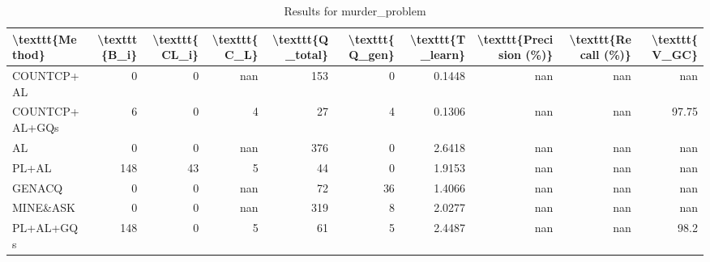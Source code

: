 \begin{table}[ht]
\caption{Results for murder_problem}
\begin{tabular}{lrrrrrrrrr}
\hline
 \textbackslash{}texttt\{Method\}   &   \textbackslash{}texttt\{B\_i\} &   \textbackslash{}texttt\{CL\_i\} &   \textbackslash{}texttt\{C\_L\} &   \textbackslash{}texttt\{Q\_total\} &   \textbackslash{}texttt\{Q\_gen\} &   \textbackslash{}texttt\{T\_learn\} &   \textbackslash{}texttt\{Precision (\%)\} &   \textbackslash{}texttt\{Recall (\%)\} &   \textbackslash{}texttt\{V\_GC\} \\
\hline
 COUNTCP+AL        &              0 &               0 &            nan &                153 &                0 &             0.1448 &                      nan &                   nan &          nan    \\
 COUNTCP+AL+GQs    &              6 &               0 &              4 &                 27 &                4 &             0.1306 &                      nan &                   nan &           97.75 \\
 AL                &              0 &               0 &            nan &                376 &                0 &             2.6418 &                      nan &                   nan &          nan    \\
 PL+AL             &            148 &              43 &              5 &                 44 &                0 &             1.9153 &                      nan &                   nan &          nan    \\
 GENACQ            &              0 &               0 &            nan &                 72 &               36 &             1.4066 &                      nan &                   nan &          nan    \\
 MINE\&ASK          &              0 &               0 &            nan &                319 &                8 &             2.0277 &                      nan &                   nan &          nan    \\
 PL+AL+GQs         &            148 &               0 &              5 &                 61 &                5 &             2.4487 &                      nan &                   nan &           98.2  \\
\hline
\end{tabular}
\end{table}